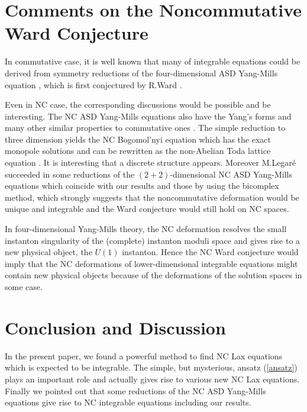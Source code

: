 \documentclass[a4paper,12pt]{article}\setlength{\topmargin}{-1cm}
\begin{document}
\section{Comments on the Noncommutative Ward Conjecture}

In commutative case, it is well known that 
many of integrable equations could be
derived from symmetry reductions of the four-dimensional
ASD Yang-Mills equation \cite{Conj},
which is first conjectured by R.Ward \cite{Ward}.

Even in NC case,
the corresponding discussions would be possible and be interesting.
The NC ASD Yang-Mills equations also have the Yang's 
forms \cite{Nekrasov2, Nekrasov} and many other similar
properties to commutative ones \cite{KKO}.
The simple reduction to three dimension
yields the NC Bogomol'nyi equation
which has the exact monopole solutions and can be rewritten 
as the non-Abelian Toda lattice equation \cite{Nekrasov, GrNe}.
It is interesting that a discrete structure appears.
Moreover M.Legar\'e \cite{Legare} succeeded in some reductions
of the $(2+2)$-dimensional NC ASD Yang-Mills equations which coincide
with our results and those by using the bicomplex method,
which strongly suggests that the noncommutative deformation
would be unique and integrable
and the Ward conjecture would still hold on NC spaces.

In four-dimensional Yang-Mills theory,
the NC deformation resolves the small instanton 
singularity of the (complete) instanton moduli space
and gives rise to a new physical object, the $U(1)$ instanton.
Hence the NC Ward conjecture would imply that
the NC deformations of lower-dimensional integrable equations
might contain new physical objects
because of the deformations of the solution spaces in some case.

\section{Conclusion and Discussion}

In the present paper, 
we found a powerful method to
find NC Lax equations which
is expected to be integrable.
The simple, but mysterious, ansatz (\ref{ansatz}) 
plays an important role
and actually gives rise to various new NC Lax equations.
Finally we pointed out that some reductions of the NC
ASD Yang-Mills equations give rise to
NC integrable equations including our results.
\end{document}
